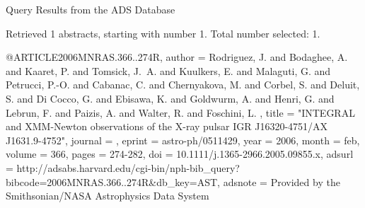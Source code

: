 Query Results from the ADS Database


Retrieved 1 abstracts, starting with number 1.  Total number selected: 1.

@ARTICLE{2006MNRAS.366..274R,
   author = {{Rodriguez}, J. and {Bodaghee}, A. and {Kaaret}, P. and {Tomsick}, J.~A. and 
	{Kuulkers}, E. and {Malaguti}, G. and {Petrucci}, P.-O. and 
	{Cabanac}, C. and {Chernyakova}, M. and {Corbel}, S. and {Deluit}, S. and 
	{Di Cocco}, G. and {Ebisawa}, K. and {Goldwurm}, A. and {Henri}, G. and 
	{Lebrun}, F. and {Paizis}, A. and {Walter}, R. and {Foschini}, L.
	},
    title = "{INTEGRAL and XMM-Newton observations of the X-ray pulsar IGR J16320-4751/AX J1631.9-4752}",
  journal = {\mnras},
   eprint = {astro-ph/0511429},
     year = 2006,
    month = feb,
   volume = 366,
    pages = {274-282},
      doi = {10.1111/j.1365-2966.2005.09855.x},
   adsurl = {http://adsabs.harvard.edu/cgi-bin/nph-bib_query?bibcode=2006MNRAS.366..274R&db_key=AST},
  adsnote = {Provided by the Smithsonian/NASA Astrophysics Data System}
}



